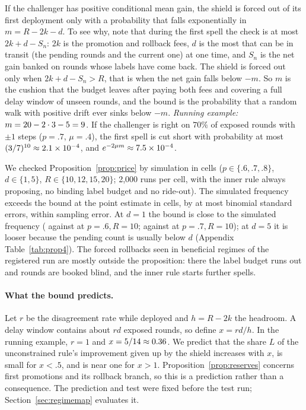 \documentclass[10pt]{article}
\theoremstyle{plain}
\theoremstyle{definition}
\begin{document}
If the challenger has positive conditional mean gain, the shield is forced out of its first deployment only with a probability that falls exponentially in $m=R-2k-d$. To see why, note that during the first spell the check is at most $2k+d-S_n$: $2k$ is the promotion and rollback fees, $d$ is the most that can be in transit (the pending rounds and the current one) at one time, and $S_n$ is the net gain banked on rounds whose labels have come back. The shield is forced out only when $2k+d-S_n>R$, that is when the net gain falls below $-m$. So $m$ is the cushion that the budget leaves after paying both fees and covering a full delay window of unseen rounds, and the bound is the probability that a random walk with positive drift ever sinks below $-m$. \emph{Running example:} $m=20-2\cdot3-5=9$. If the challenger is right on $70\%$ of exposed rounds with $\pm1$ steps ($p=.7$, $\mu=.4$), the first spell is cut short with probability at most $(3/7)^{10}\approx2.1\times10^{-4}$, and $e^{-2\mu m}\approx7.5\times10^{-4}$.

We checked Proposition~\ref{prop:price} by simulation in \PFourCells{} cells ($p\in\{.6,.7,.8\}$, $d\in\{1,5\}$, $R\in\{10,12,15,20\}$; 2{,}000 runs per cell, with the inner rule always proposing, no binding label budget and no ride-out). The simulated frequency exceeds the bound at the point estimate in \PFourAbove{} cells, by at most \PFourMaxZ{} binomial standard errors, within sampling error. At $d=1$ the bound is close to the simulated frequency (\PFourTightEmp{} against \PFourTightBound{} at $p=.6,R=10$; \PFourTightEmpB{} against \PFourTightBoundB{} at $p=.7,R=10$); at $d=5$ it is looser because the pending count is usually below $d$ (Appendix Table~\ref{tab:prop4}). The forced rollbacks seen in beneficial regimes of the registered run are mostly outside the proposition: there the label budget runs out and rounds are booked blind, and the inner rule starts further spells.

\paragraph{What the bound predicts.}
Let $r$ be the disagreement rate while deployed and $h=R-2k$ the headroom. A delay window contains about $rd$ exposed rounds, so define $x=rd/h$. In the running example, $r=1$ and $x=5/14\approx0.36$. We predict that the share $L$ of the unconstrained rule's improvement given up by the shield increases with $x$, is small for $x<.5$, and is near one for $x>1$. Proposition~\ref{prop:reserves} concerns first promotions and its rollback branch, so this is a prediction rather than a consequence. The prediction and test were fixed before the test run; Section~\ref{sec:regimemap} evaluates it.
\end{document}
